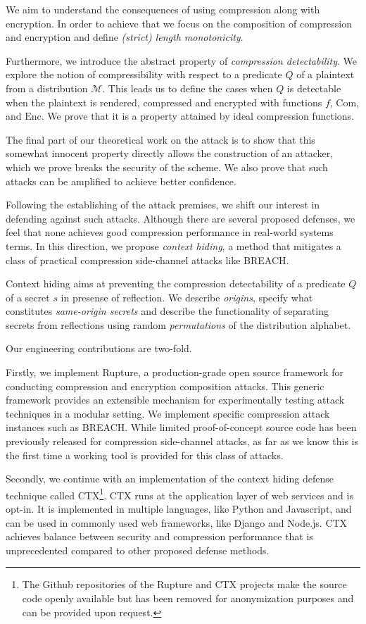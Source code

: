 \documentclass[conference, letterpaper, 10pt]{IEEEtran}
\begin{document}
We aim to understand the consequences of using
compression along with encryption. In order to achieve that we focus on the
composition of compression and encryption and define \textit{(strict) length
monotonicity}.

Furthermore, we introduce the abstract property of \textit{compression
detectability}. We explore the notion of compressibility with respect to a
predicate $Q$ of a plaintext from a distribution $\mathcal{M}$. This leads us to
define the cases when $Q$ is detectable when the plaintext is rendered,
compressed and encrypted with functions $f$, $\textrm{Com}$, and $\textrm{Enc}$. We prove that it
is a property attained by ideal compression functions.

The final part of our theoretical work on the attack is to show that this
somewhat innocent property directly allows the construction of an attacker,
which we prove breaks the security of the scheme. We also prove that such
attacks can be amplified to achieve better confidence.

Following the establishing of the attack premises, we shift our interest in
defending against such attacks. Although there are several proposed defenses, we
feel that none achieves good compression performance in real-world systems
terms. In this direction, we propose \textit{context hiding}, a method that
mitigates a class of practical compression side-channel attacks like BREACH.

Context hiding aims at preventing the compression detectability of a predicate
$Q$ of a secret $s$ in presense of reflection. We describe \textit{origins},
specify what constitutes \textit{same-origin secrets} and describe the
functionality of separating secrets from reflections using random
\textit{permutations} of the distribution alphabet.

Our engineering contributions are two-fold.

Firstly, we implement Rupture\footnotemark[1], a production-grade open source framework for
conducting compression and encryption composition attacks. This generic
framework provides an extensible mechanism for experimentally testing attack
techniques in a modular setting. We implement specific compression attack
instances such as BREACH. While limited proof-of-concept source code has been
previously released for compression side-channel attacks, as far as we know this
is the first time a working tool is provided for this class of attacks.

Secondly, we continue with an implementation of the context hiding defense
technique called CTX\footnote[1]{The Github repositories of the Rupture and CTX
projects make the source code openly available but has been removed for
anonymization purposes and can be provided upon request.}. CTX runs at the
application layer of web services and is opt-in. It is implemented in multiple
languages, like Python and Javascript, and can be used in commonly used web
frameworks, like Django and Node.js. CTX achieves balance between security and
compression performance that is unprecedented compared to other proposed defense
methods.
\end{document}
